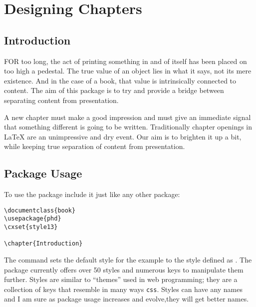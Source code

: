 \chapter{Designing Chapters}

\section{Introduction}

FOR too long, the act of printing something in and of itself has been placed on too high a pedestal. The true value of an object lies in what it says, not its mere existence. And in the case of a book, that value is intrinsically connected to content. The aim of this package is to try and provide a bridge between separating content from presentation.

A new chapter must make a good impression and must give an immediate signal that something different is going to be written. Traditionally chapter openings in LaTeX are an unimpressive and dry event. Our aim is to brighten it up a bit, while keeping true separation of content from presentation.



\section{Package Usage}

To use the package include it just like any other package:

\begin{tcolorbox}
\begin{lstlisting}
\documentclass{book}
\usepackage{phd}
\cxset{style13}

\chapter{Introduction}

\end{lstlisting}
\end{tcolorbox}

The command  sets the default style for the example to the style defined as . The package currently offers over 50 styles and numerous keys to manipulate them further. Styles are similar to \enquote{themes} used in web programming; they are a collection of keys that resemble in many ways \texttt{css}. Styles can have any names and I am sure as package usage increases and evolve,they will get better names. 


